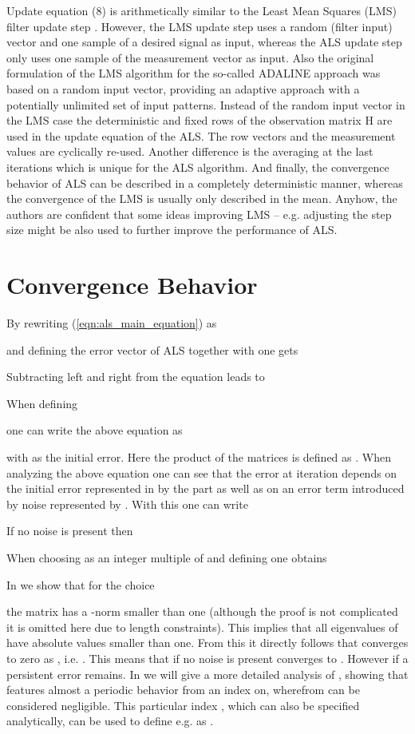 \documentclass{article}
\begin{document}
Update equation (8) is arithmetically similar to the Least Mean Squares 
(LMS) filter update step \cite{LMS}. However, the LMS update step uses a random 
(filter input) vector and one sample of a desired signal as input, whereas the ALS 
update step only uses one sample  of the measurement vector  as input. 
Also the original formulation of the LMS algorithm for the so-called 
ADALINE \cite{LMS_first, ADALINE}
approach was based on a random input vector, providing an adaptive 
approach with a potentially unlimited set of input patterns.
Instead 
of the random input vector in the LMS case the deterministic and fixed rows of the 
observation matrix H are used in the update equation of the ALS. The row vectors 
 and the measurement values  are cyclically re-used. 
Another difference is 
the averaging at the last  iterations which is unique for the ALS algorithm. And 
finally, the convergence behavior of ALS can be described in a completely 
deterministic manner, whereas the convergence of the LMS is usually only described 
in the mean. Anyhow, the authors are confident that some ideas improving LMS -- e.g. adjusting the 
step size \cite{LMS_variable, LMS_variable2} 
might be also
used to further improve the performance of ALS. 
\section{Convergence Behavior}
\label{sec:conv_behav} 
By rewriting (\ref{eqn:als_main_equation}) as

and defining the error vector of ALS 
 together with 
 one gets

Subtracting  left and right from the equation leads to 

When defining 

one can write the above equation as 

with  as the initial error.
Here 
the product of the matrices is defined as .
When analyzing the above equation one can see that the error at iteration  depends on the initial error 
represented in  by the part 
as well as on an error term introduced by noise represented by . With this one can write

If no noise is present then

When choosing  as an integer multiple of  and defining 
 one obtains

In \cite{journal} we show that for the choice

the matrix  has a -norm smaller than one (although the proof is 
not complicated it is omitted here due to length constraints).  This implies that all  
eigenvalues of  have absolute values
smaller than one. 
From this it directly follows that  converges to zero as 
, i.e. .
This means that if no noise is present  
converges to .
However if  a persistent error  remains.
In \cite{journal} we will give a more detailed analysis of
, showing that  features almost a 
periodic behavior 
from an index  on, wherefrom  can be considered negligible.
This particular index , which can also be specified analytically, can be 
used to define  e.g. as .
\end{document}
